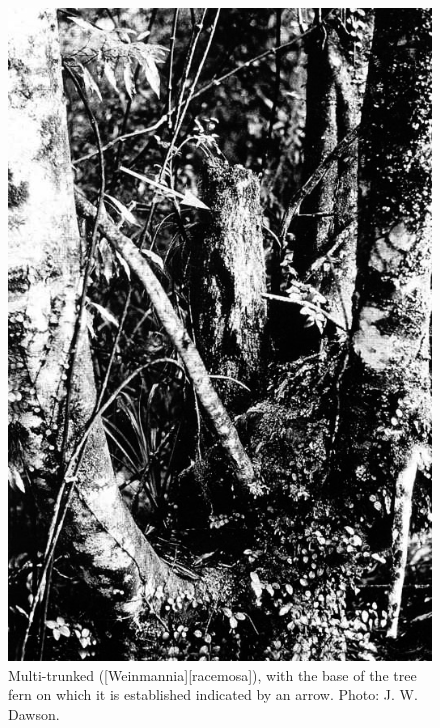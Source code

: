\begin{figure}[t]
\begin{minipage}[t]{\textwidth}
		\begin{minipage}[t]{(\textwidth-\fgap) * \real{0.485}}
			\centering
			\includegraphics[width=\textwidth]{graphics/figure56kamahi.jpg}
			\caption[Multi-trunked kamahi]{Multi-trunked  ([Weinmannia][racemosa]), with the base of the tree fern on which it is established indicated by an arrow.
			Photo: J. W. Dawson.}%
			\label{fig:56kamahi}
		\end{minipage}
	\end{minipage}
\end{figure}

